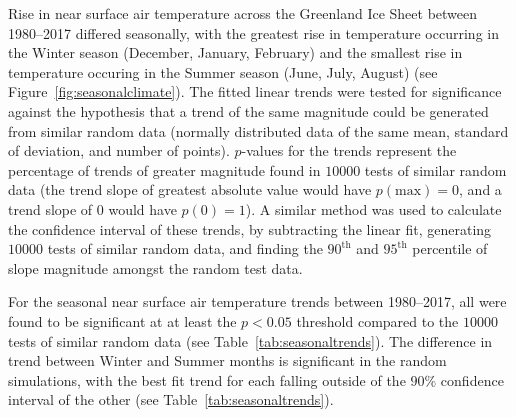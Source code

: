 \documentclass[11pt]{report}
\begin{document}
Rise in near surface air temperature across the Greenland Ice Sheet between 1980--2017 differed seasonally, with the greatest rise in temperature occurring in the Winter season (December, January, February) and the smallest rise in temperature occuring in the Summer season (June, July, August) (see Figure~\ref{fig:seasonalclimate}). The fitted linear trends were tested for significance against the hypothesis that a trend of the same magnitude could be generated from similar random data (normally distributed data of the same mean, standard of deviation, and number of points). $p$-values for the trends represent the percentage of trends of greater magnitude found in $10000$ tests of similar random data (the trend slope of greatest absolute value would have $p(\mathrm{max}) = 0$, and a trend slope of $0$ would have $p(0) = 1$). A similar method was used to calculate the confidence interval of these trends, by subtracting the linear fit, generating $10000$ tests of similar random data, and finding the $90^{\mathrm{th}}$ and $95^{\mathrm{th}}$ percentile of slope magnitude amongst the random test data. 

For the seasonal near surface air temperature trends between 1980--2017, all were found to be significant at at least the $p < 0.05$ threshold compared to the $10000$ tests of similar random data (see Table~\ref{tab:seasonaltrends}). The difference in trend between Winter and Summer months is significant in the random simulations, with the best fit trend for each falling outside of the $90\%$ confidence interval of the other (see Table~\ref{tab:seasonaltrends}).
\end{document}
